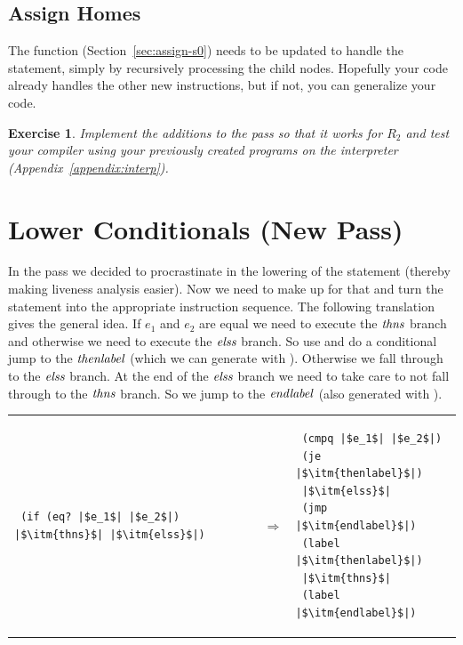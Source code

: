 \documentclass[11pt]{book}
\newtheorem{exercise}[theorem]{Exercise}
\begin{document}
\subsection{Assign Homes}
\label{sec:assign-homes-r2}

The  function (Section~\ref{sec:assign-s0}) needs
to be updated to handle the  statement, simply by recursively
processing the child nodes.  Hopefully your code already handles the
other new instructions, but if not, you can generalize your code.

\begin{exercise}\normalfont
Implement the additions to the  pass so that
it works for $R_2$ and test your compiler using your previously
created programs on the  interpreter
(Appendix~\ref{appendix:interp}).
\end{exercise}


\section{Lower Conditionals (New Pass)}
\label{sec:lower-conditionals}

In the  pass we decided to procrastinate in
the lowering of the  statement (thereby making liveness
analysis easier). Now we need to make up for that and turn the
 statement into the appropriate instruction sequence.  The
following translation gives the general idea. If $e_1$ and $e_2$ are
equal we need to execute the $\mathit{thns}$ branch and otherwise we need
to execute the $\mathit{elss}$ branch. So use  and do a
conditional jump to the $\mathit{thenlabel}$ (which we can generate with
).  Otherwise we fall through to the $\mathit{elss}$
branch. At the end of the $\mathit{elss}$ branch we need to take care to
not fall through to the $\mathit{thns}$ branch. So we jump to the
$\mathit{endlabel}$ (also generated with ).

\begin{tabular}{lll}
\begin{minipage}{0.4\textwidth}
\begin{lstlisting}
 (if (eq? |$e_1$| |$e_2$|) |$\itm{thns}$| |$\itm{elss}$|)
\end{lstlisting}
\end{minipage}
&
$\Rightarrow$
&
\begin{minipage}{0.4\textwidth}
\begin{lstlisting}
 (cmpq |$e_1$| |$e_2$|)
 (je |$\itm{thenlabel}$|)
 |$\itm{elss}$|
 (jmp |$\itm{endlabel}$|)
 (label |$\itm{thenlabel}$|)
 |$\itm{thns}$|
 (label |$\itm{endlabel}$|)
\end{lstlisting}
\end{minipage}
\end{tabular} 
\end{document}
